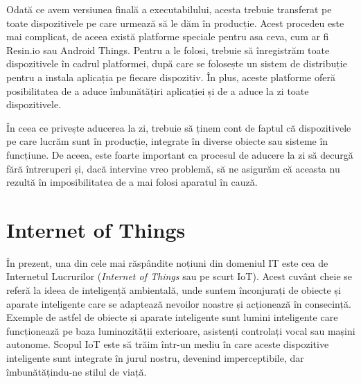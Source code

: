 Odată ce avem versiunea finală a executabilului, acesta trebuie transferat pe toate dispozitivele pe care urmează să le dăm în producție.
Acest procedeu este mai complicat, de aceea există platforme speciale pentru asa ceva, cum ar fi Resin.io sau Android Things.
Pentru a le folosi, trebuie să înregistrăm toate dispozitivele în cadrul platformei, după care se folosește un sistem de distribuție pentru a instala aplicația pe fiecare dispozitiv.
În plus, aceste platforme oferă posibilitatea de a aduce îmbunătățiri aplicației și de a aduce la zi toate dispozitivele.

În ceea ce privește aducerea la zi, trebuie să ținem cont de faptul că dispozitivele pe care lucrăm sunt în producție, integrate în diverse obiecte sau sisteme în funcțiune.
De aceea, este foarte important ca procesul de aducere la zi să decurgă fără întreruperi și, dacă intervine vreo problemă, să ne asigurăm că aceasta nu rezultă în imposibilitatea de a mai folosi aparatul în cauză.

\section{Internet of Things}
\label{sec:embed:iot}

În prezent, una din cele mai răspândite noțiuni din domeniul IT este cea de Internetul Lucrurilor (\textit{Internet of Things} sau pe scurt IoT).
Acest cuvânt cheie se referă la ideea de inteligență ambientală, unde suntem înconjurați de obiecte și aparate inteligente care se adaptează nevoilor noastre și acționează în consecință.
Exemple de astfel de obiecte și aparate inteligente sunt lumini inteligente care funcționează pe baza luminozității exterioare, asistenți controlați vocal sau mașini autonome.
Scopul IoT este să trăim într-un mediu în care aceste dispozitive inteligente sunt integrate în jurul nostru, devenind imperceptibile, dar îmbunătățindu-ne stilul de viață.

